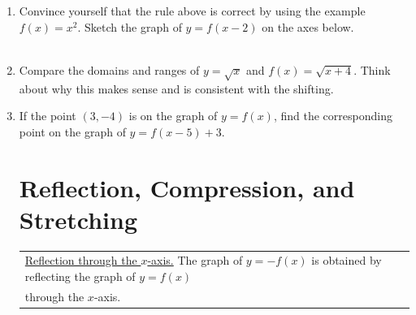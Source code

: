 \documentclass[11pt]{article}
\begin{document}
\begin{enumerate}
\item Convince yourself that the rule above is correct by using the example $f(x)=x^2.$ Sketch the graph of $y = f(x -2)$ on the axes below.  \\
 \\[1in]

\item Compare the domains and ranges of $y = \sqrt{x}$ and $f(x)=\sqrt{x+4}$. Think about why this makes sense and is consistent with the shifting.\\[2in]



\item If the point $(3, -4)$ is on the graph of $y = f(x)$, find the corresponding point on the graph of $y = f(x - 5)+3$. \\

\newpage

\section{Reflection, Compression, and Stretching}
\hspace{-.4in} \begin{tabular}{| l |} \hline \underline{Reflection through the $x$-axis.} The graph of $y=-f(x)$ is obtained by reflecting the graph of $y=f(x)$ \\ through the $x$-axis.
 \\ \hline
\end{tabular} 



\end{enumerate}
\end{document}
